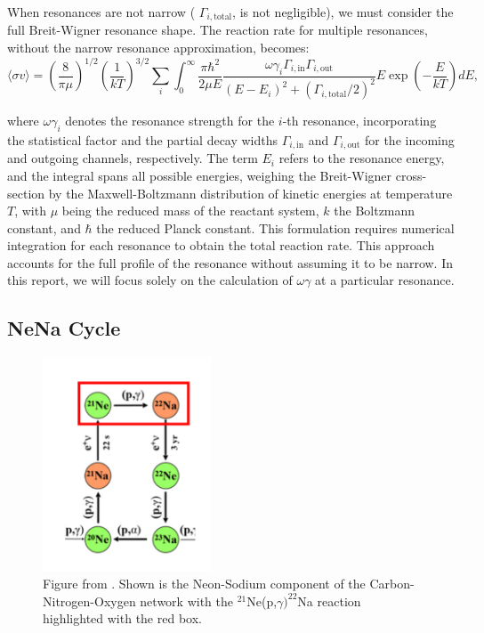 \documentclass[a4paper,12pt]{article}
\def\reac{$^{21}$Ne(p,$\gamma)^{22}$Na reaction }
\begin{document}
When resonances are not narrow ( \(\Gamma_{i,\text{total}}\), is not negligible), we must consider the full Breit-Wigner resonance shape. The reaction rate for multiple resonances, without the narrow resonance approximation, becomes:
\begin{equation}
\langle \sigma v \rangle = \left( \frac{8}{\pi \mu} \right)^{1/2} \left( \frac{1}{kT} \right)^{3/2} \sum_i \int_0^\infty \frac{\pi \hbar^2}{2 \mu E} \frac{\omega \gamma_i \Gamma_{i,\text{in}}\Gamma_{i,\text{out}}}{(E - E_i)^2 + (\Gamma_{i,\text{total}}/2)^2} E \exp \left( -\frac{E}{kT} \right) dE,
\end{equation}

where \(\omega \gamma_i\) denotes the resonance strength for the \(i\)-th resonance, incorporating the statistical factor and the partial decay widths \(\Gamma_{i,\text{in}}\) and \(\Gamma_{i,\text{out}}\) for the incoming and outgoing channels, respectively. The term \(E_i\) refers to the resonance energy, and the integral spans all possible energies, weighing the Breit-Wigner cross-section by the Maxwell-Boltzmann distribution of kinetic energies at temperature \(T\), with \(\mu\) being the reduced mass of the reactant system, \(k\) the Boltzmann constant, and \(\hbar\) the reduced Planck constant. This formulation requires numerical integration for each resonance to obtain the total reaction rate. This approach accounts for the full profile of the resonance without assuming it to be narrow.  In this report, we will focus solely on the calculation of $\omega\gamma$ at a particular resonance.



\subsection{NeNa Cycle}

\begin{figure}[H]
    \centering
    \includegraphics[width=5cm]{nena.png}
    \caption{Figure from \cite{nena}. Shown is the Neon-Sodium component of the Carbon-Nitrogen-Oxygen network with the \reac highlighted with the red box.}
    \label{fig:Nena}
\end{figure}
\end{document}
